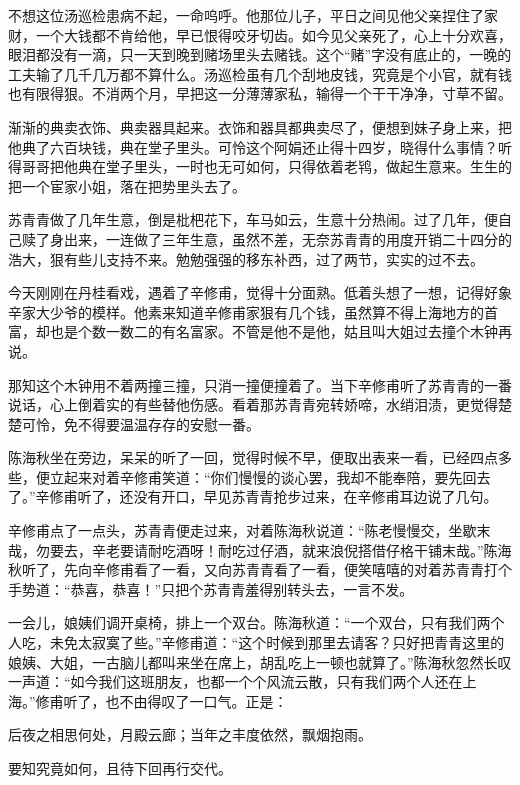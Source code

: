 \documentclass[12pt,UTF8]{ctexbook}
\begin{document}
{{{不想这位汤巡检患病不起，一命呜呼。他那位儿子，平日之间见他父亲捏住了家财，一个大钱都不肯给他，早已恨得咬牙切齿。如今见父亲死了，心上十分欢喜，眼泪都没有一滴，只一天到晚到赌场里头去赌钱。这个“赌”字没有底止的，一晚的工夫输了几千几万都不算什么。汤巡检虽有几个刮地皮钱，究竟是个小官，就有钱也有限得狠。不消两个月，早把这一分薄薄家私，输得一个干干净净，寸草不留。

渐渐的典卖衣饰、典卖器具起来。衣饰和器具都典卖尽了，便想到妹子身上来，把他典了六百块钱，典在堂子里头。可怜这个阿娟还止得十四岁，晓得什么事情？听得哥哥把他典在堂子里头，一时也无可如何，只得依着老鸨，做起生意来。生生的把一个宦家小姐，落在把势里头去了。

苏青青做了几年生意，倒是枇杷花下，车马如云，生意十分热闹。过了几年，便自己赎了身出来，一连做了三年生意，虽然不差，无奈苏青青的用度开销二十四分的浩大，狠有些儿支持不来。勉勉强强的移东补西，过了两节，实实的过不去。

今天刚刚在丹桂看戏，遇着了辛修甫，觉得十分面熟。低着头想了一想，记得好象辛家大少爷的模样。他素来知道辛修甫家狠有几个钱，虽然算不得上海地方的首富，却也是个数一数二的有名富家。不管是他不是他，姑且叫大姐过去撞个木钟再说。

那知这个木钟用不着两撞三撞，只消一撞便撞着了。当下辛修甫听了苏青青的一番说话，心上倒着实的有些替他伤感。看着那苏青青宛转娇啼，水绡泪渍，更觉得楚楚可怜，免不得要温温存存的安慰一番。

陈海秋坐在旁边，呆呆的听了一回，觉得时候不早，便取出表来一看，已经四点多些，便立起来对着辛修甫笑道：“你们慢慢的谈心罢，我却不能奉陪，要先回去了。”辛修甫听了，还没有开口，早见苏青青抢步过来，在辛修甫耳边说了几句。

辛修甫点了一点头，苏青青便走过来，对着陈海秋说道：“陈老慢慢交，坐歇末哉，勿要去，辛老要请耐吃酒呀！耐吃过仔酒，就来浪倪搭借仔格干铺末哉。”陈海秋听了，先向辛修甫看了一看，又向苏青青看了一看，便笑嘻嘻的对着苏青青打个手势道：“恭喜，恭喜！”只把个苏青青羞得别转头去，一言不发。

一会儿，娘姨们调开桌椅，排上一个双台。陈海秋道：“一个双台，只有我们两个人吃，未免太寂寞了些。”辛修甫道：“这个时候到那里去请客？只好把青青这里的娘姨、大姐，一古脑儿都叫来坐在席上，胡乱吃上一顿也就算了。”陈海秋忽然长叹一声道：“如今我们这班朋友，也都一个个风流云散，只有我们两个人还在上海。”修甫听了，也不由得叹了一口气。正是：

后夜之相思何处，月殿云廊；当年之丰度依然，飘烟抱雨。

要知究竟如何，且待下回再行交代。





}}}
\end{document}
